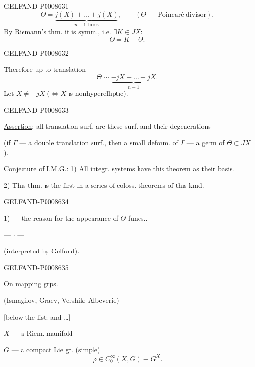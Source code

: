 \begin{GelfandAdjacentEvidence}{GELFAND-P000863}{1}
\[
\Theta=\underbrace{j(X)+\ldots+j(X)}_{n-1\text{ times}},
\qquad (\Theta\text{ — Poincaré divisor}).
\]
By Riemann’s thm. it is symm., i.e. \(\exists K\in JX\):
\[
\Theta=K-\Theta.
\]
\end{GelfandAdjacentEvidence}
\begin{GelfandAdjacentEvidence}{GELFAND-P000863}{2}


Therefore up to translation
\[
\Theta\sim\underbrace{-jX-\ldots-jX}_{n-1}.
\]
Let \(X\ne-jX\) (\(\Leftrightarrow X\) is nonhyperelliptic).
\end{GelfandAdjacentEvidence}
\begin{GelfandAdjacentEvidence}{GELFAND-P000863}{3}


\uline{Assertion}: all translation surf. are these surf. and their degenerations

(if \(\Gamma\) — a double translation surf., then a small deform. of \(\Gamma\) — a germ of \(\Theta\subset JX\)).

\uline{Conjecture of I.M.G.}: 1) All integr. systems have this theorem as their basis.

2) This thm. is the first in a series of coloss. theorems of this kind.
\end{GelfandAdjacentEvidence}
\begin{GelfandAdjacentEvidence}{GELFAND-P000863}{4}


1) — the reason for the appearance of \(\Theta\)-funcs..
\begin{center}— \(\cdot\) —\end{center}

 \quad {} (interpreted by Gelfand).
\end{GelfandAdjacentEvidence}
\begin{GelfandAdjacentEvidence}{GELFAND-P000863}{5}


On mapping grps.

(Ismagilov, Graev, Vershik; Albeverio)

[below the list: and \ldots]

\(X\) — a Riem. manifold

\(G\) — a compact Lie gr. (simple)
\[
\varphi\in C_0^\infty(X,G)\equiv G^X.
\]
\end{GelfandAdjacentEvidence}
